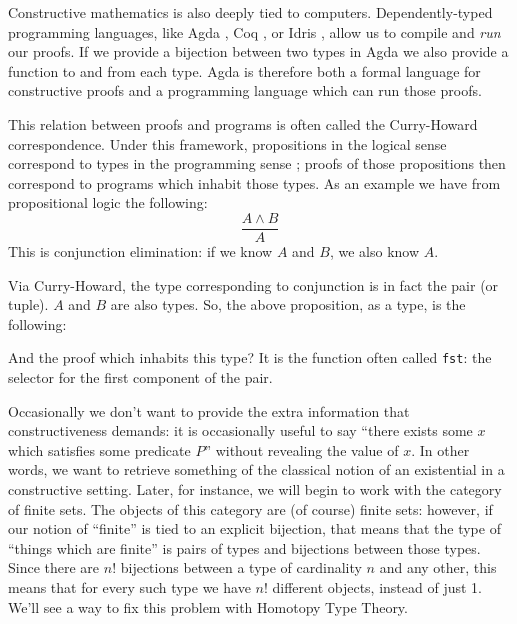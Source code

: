 Constructive mathematics is also deeply tied to computers.
Dependently-typed programming languages, like Agda
\citep{norellDependentlyTypedProgramming2008}, Coq
\citep{thecoqdevelopmentteamCoqProofAssistant2020}, or Idris
\citep{bradyIdrisGeneralpurposeDependently2013}, allow us to compile and
\emph{run} our proofs.
If we provide a bijection between two types in Agda we also provide a function
to and from each type.
Agda is therefore both a formal language for constructive proofs and a
programming language which can run those proofs.

This relation between proofs and programs is often called the Curry-Howard
correspondence.
Under this framework, propositions in the logical sense correspond to types in
the programming sense \citep{wadlerPropositionsTypes2015}; proofs of those
propositions then correspond to programs which inhabit those types.
As an example we have from propositional logic the following:
\begin{equation*}
  \frac{A \wedge B}{A}
\end{equation*}
This is conjunction elimination: if we know \(A\) and \(B\), we also know \(A\).

Via Curry-Howard, the type corresponding to conjunction is in fact the pair (or
tuple).
\(A\) and \(B\) are also types.
So, the above proposition, as a type, is the following:
\begin{agdalisting*}
   \vspace{-\baselineskip}
\end{agdalisting*}
And the proof which inhabits this type?
It is the function often called \verb+fst+: the selector for the first component
of the pair.
\begin{agdalisting*}
   \vspace{-\baselineskip}
\end{agdalisting*}

Occasionally we don't want to provide the extra information that
constructiveness demands: it is occasionally useful to say ``there exists some
\(x\) which satisfies some predicate \(P\)'' without revealing the value of \(x\).
In other words, we want to retrieve something of the classical notion of an
existential in a constructive setting.
Later, for instance, we will begin to work with the
category of finite sets.
The objects of this category are (of course) finite sets: however, if our notion
of ``finite'' is tied to an explicit bijection, that means that the type of
``things which are finite'' is pairs of types and bijections between those
types. 
Since there are \(n!\) bijections between a type of cardinality \(n\) and any
other, this means that for every such type we have \(n!\) different objects,
instead of just 1.
We'll see a way to fix this problem with Homotopy Type Theory.

